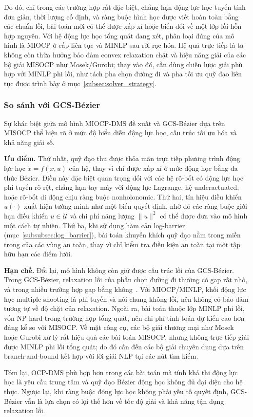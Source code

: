 Do đó, chỉ trong các trường hợp rất đặc biệt, chẳng hạn động lực học tuyến tính đơn giản, thời lượng cố định, và ràng buộc hình học được viết hoàn toàn bằng các chuẩn lồi, bài toán mới có thể được xấp xỉ hoặc biến đổi về một lớp lồi hỗn hợp nguyên. Với hệ động lực học tổng quát đang xét, phân loại đúng của mô hình là MIOCP ở cấp liên tục và MINLP sau rời rạc hóa. Hệ quả trực tiếp là ta không còn thừa hưởng bảo đảm convex relaxation chặt và hiệu năng giải của các bộ giải MISOCP như Mosek/Gurobi; thay vào đó, cần dùng chiến lược giải phù hợp với MINLP phi lồi, như tách pha chọn đường đi và pha tối ưu quỹ đạo liên tục được trình bày ở mục~\ref{subsec:solver_strategy}.

\subsubsection{So sánh với GCS-Bézier}

Sự khác biệt giữa mô hình MIOCP-DMS đề xuất và GCS-Bézier dựa trên MISOCP thể hiện rõ ở mức độ biểu diễn động lực học, cấu trúc tối ưu hóa và khả năng giải số.

\textbf{Ưu điểm.} Thứ nhất, quỹ đạo thu được thỏa mãn trực tiếp phương trình động lực học $\dot x = f(x,u)$ của hệ, thay vì chỉ được xấp xỉ ở mức động học bằng đa thức Bézier. Điều này đặc biệt quan trọng đối với các hệ rô-bốt có động lực học phi tuyến rõ rệt, chẳng hạn tay máy với động lực Lagrange, hệ underactuated, hoặc rô-bốt di động chịu ràng buộc nonholonomic. Thứ hai, tín hiệu điều khiển $u(\cdot)$ xuất hiện tường minh như một biến quyết định, nhờ đó các ràng buộc giới hạn điều khiển $u\in\mathcal U$ và chi phí năng lượng $\|u\|^2$ có thể được đưa vào mô hình một cách tự nhiên. Thứ ba, khi sử dụng hàm cản log-barrier (mục~\ref{subsubsec:log_barrier}), bài toán khuyến khích quỹ đạo nằm trong miền trong của các vùng an toàn, thay vì chỉ kiểm tra điều kiện an toàn tại một tập hữu hạn các điểm lưới.

\textbf{Hạn chế.} Đổi lại, mô hình không còn giữ được cấu trúc lồi của GCS-Bézier. Trong GCS-Bézier, relaxation lồi của phần chọn đường đi thường có gap rất nhỏ, và trong nhiều trường hợp gap bằng không~\cite{MarcucciEtAl2023GCS}. Với MIOCP/MINLP, khối động lực học multiple shooting là phi tuyến và nói chung không lồi, nên không có bảo đảm tương tự về độ chặt của relaxation. Ngoài ra, bài toán thuộc lớp MINLP phi lồi, vốn NP-hard trong trường hợp tổng quát, nên chi phí tính toán dự kiến cao hơn đáng kể so với MISOCP. Về mặt công cụ, các bộ giải thương mại như Mosek hoặc Gurobi xử lý rất hiệu quả các bài toán MISOCP, nhưng không trực tiếp giải được MINLP phi lồi tổng quát; do đó cần đến các bộ giải chuyên dụng dựa trên branch-and-bound kết hợp với lời giải NLP tại các nút tìm kiếm.

Tóm lại, OCP-DMS phù hợp hơn trong các bài toán mà tính khả thi động lực học là yêu cầu trung tâm và quỹ đạo Bézier động học không đủ đại diện cho hệ thực. Ngược lại, khi ràng buộc động lực học không phải yếu tố quyết định, GCS-Bézier vẫn là lựa chọn có lợi thế hơn về tốc độ giải và khả năng tận dụng relaxation lồi.

